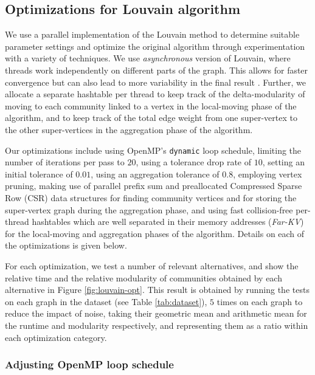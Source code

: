 \subsection{Optimizations for Louvain algorithm}
\label{sec:louvain}

We use a parallel implementation of the Louvain method to determine suitable parameter settings and optimize the original algorithm through experimentation with a variety of techniques. We use \textit{asynchronous} version of Louvain, where threads work independently on different parts of the graph. This allows for faster convergence but can also lead to more variability in the final result \cite{com-blondel08, com-halappanavar17}. Further, we allocate a separate hashtable per thread to keep track of the delta-modularity of moving to each community linked to a vertex in the local-moving phase of the algorithm, and to keep track of the total edge weight from one super-vertex to the other super-vertices in the aggregation phase of the algorithm.

Our optimizations include using OpenMP's \verb|dynamic| loop schedule, limiting the number of iterations per pass to $20$, using a tolerance drop rate of $10$, setting an initial tolerance of $0.01$, using an aggregation tolerance of $0.8$, employing vertex pruning, making use of parallel prefix sum and preallocated Compressed Sparse Row (CSR) data structures for finding community vertices and for storing the super-vertex graph during the aggregation phase, and using fast collision-free per-thread hashtables which are well separated in their memory addresses (\textit{Far-KV}) for the local-moving and aggregation phases of the algorithm. Details on each of the optimizations is given below.

For each optimization, we test a number of relevant alternatives, and show the relative time and the relative modularity of communities obtained by each alternative in Figure \ref{fig:louvain-opt}. This result is obtained by running the tests on each graph in the dataset (see Table \ref{tab:dataset}), $5$ times on each graph to reduce the impact of noise, taking their geometric mean and arithmetic mean for the runtime and modularity respectively, and representing them as a ratio within each optimization category.


\subsubsection{Adjusting OpenMP loop schedule}

